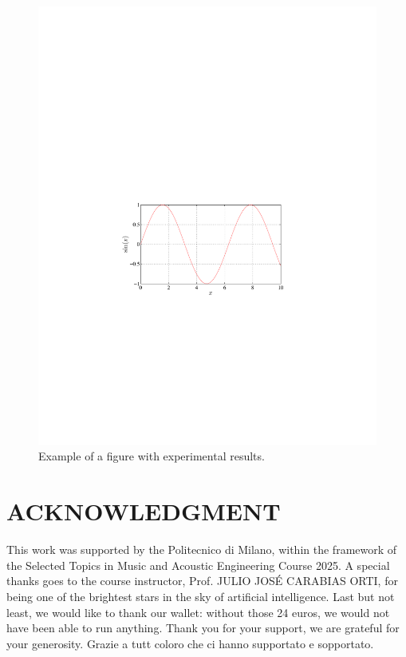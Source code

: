 \documentclass{article}
\begin{document}
\begin{sloppy}
\begin{figure}[t]
  \centering
  \centerline{\includegraphics[width=\columnwidth]{fig1a}}
  \caption{Example of a figure with experimental results.}
  \label{fig:results}
\end{figure}


\section{ACKNOWLEDGMENT}
\label{sec:ack}


This work was supported by the Politecnico di Milano,
within the framework of the Selected Topics in Music and Acoustic Engineering Course 2025.
A special thanks goes to the course instructor, Prof. JULIO JOSÉ CARABIAS ORTI, for being
one of the brightest stars in the sky of artificial intelligence.
Last but not least, we would like to thank our wallet: without those 24 euros, we would not have been able to run anything.
Thank you for your support, we are grateful for your generosity.
Grazie a tutt coloro che ci hanno supportato e sopportato.




\end{sloppy}
\end{document}
